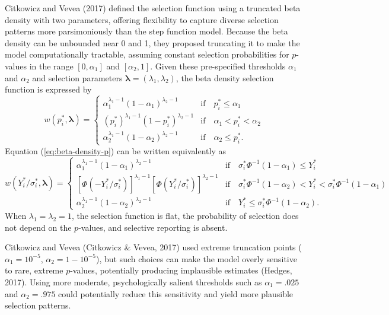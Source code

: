 \documentclass[
  american,
  man, donotrepeattitle,floatsintext]{apa7}
\begin{document}
Citkowicz and Vevea (2017) defined the selection function using a truncated beta density with two parameters, offering flexibility to capture diverse selection patterns more parsimoniously than the step function model. Because the beta density can be unbounded near 0 and 1, they proposed truncating it to make the model computationally tractable, assuming constant selection probabilities for \(p\)-values in the range \([0, \alpha_1]\) and \([\alpha_2, 1]\). Given these pre-specified thresholds \(\alpha_1\) and \(\alpha_2\) and selection parameters \(\boldsymbol\lambda = (\lambda_1, \lambda_2)\), the beta density selection function is expressed by
\begin{equation}
\label{eq:beta-density-p}
w(p^*_i, \boldsymbol\lambda) =  \begin{cases} 
\alpha_1^{\lambda_1 - 1} (1 - \alpha_1)^{\lambda_2 - 1} & \text{if} \quad p^*_i \leq \alpha_1 \\
\left(p^*_i\right)^{\lambda_1 - 1} (1 - p^*_i)^{\lambda_2 - 1} & \text{if} \quad \alpha_1 < p^*_i < \alpha_2 \\
\alpha_2^{\lambda_1 - 1} (1 - \alpha_2)^{\lambda_2 - 1} & \text{if} \quad \alpha_2 \leq p^*_i.
\end{cases}
\end{equation}
Equation (\ref{eq:beta-density-p}) can be written equivalently as
\begin{equation}
\label{eq:beta-density-y}
w(Y^*_i / \sigma^*_i, \boldsymbol\lambda) =  \begin{cases} 
\alpha_1^{\lambda_1 - 1} (1 - \alpha_1)^{\lambda_2 - 1} & \text{if} \quad \sigma^*_i \Phi^{-1}(1 - \alpha_1) \leq Y^*_i \\
\left[\Phi\left(-Y^*_i / \sigma^*_i\right)\right]^{\lambda_1 - 1} \left[\Phi\left(Y^*_i / \sigma^*_i\right)\right]^{\lambda_2 - 1} & \text{if} \quad \sigma^*_i \Phi^{-1}(1 - \alpha_2) < Y^*_i < \sigma^*_i \Phi^{-1}(1 - \alpha_1) \\
\alpha_2^{\lambda_1 - 1} (1 - \alpha_2)^{\lambda_2 - 1} & \text{if} \quad  Y^*_i \leq \sigma^*_i \Phi^{-1}(1 - \alpha_2).
\end{cases}
\end{equation}
When \(\lambda_1 = \lambda_2 = 1\), the selection function is flat, the probability of selection does not depend on the \(p\)-values, and selective reporting is absent.

Citkowicz and Vevea (Citkowicz \& Vevea, 2017) used extreme truncation points (\(\alpha_1 = 10^{-5}\), \(\alpha_2 = 1 - 10^{-5}\)), but such choices can make the model overly sensitive to rare, extreme \(p\)-values, potentially producing implausible estimates (Hedges, 2017). Using more moderate, psychologically salient thresholds such as \(\alpha_1 = .025\) and \(\alpha_2 = .975\) could potentially reduce this sensitivity and yield more plausible selection patterns.
\end{document}
